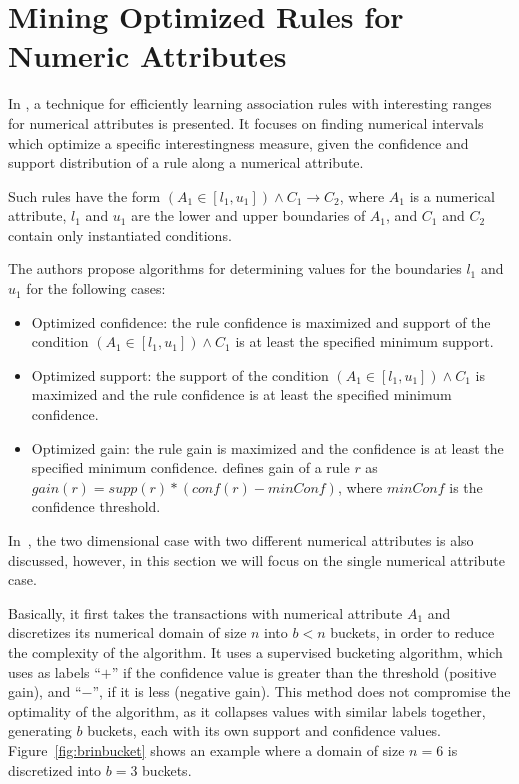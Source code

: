 \section{Mining Optimized Rules for Numeric Attributes}
\label{sec:rw-miningOptimizedRules}

In \cite{Brin99miningoptimized}, a technique for efficiently learning association rules with interesting ranges for
numerical attributes is presented. It focuses on finding numerical intervals which optimize a specific interestingness
measure, given the confidence and support distribution of a rule along a numerical attribute. 

Such rules have the form $(A_1 \in [l_1,u_1]) \wedge C_1 \rightarrow C_2$, where
$A_1$ is a numerical attribute, $l_1$ and $u_1$ are the lower and upper boundaries of $A_1$, and $C_1$ and $C_2$
contain
only instantiated conditions.

The authors propose algorithms for determining values for the boundaries $l_1$ and $u_1$ for the following cases:

\begin{itemize}
 \item Optimized confidence: the rule confidence is maximized and  support of the condition $(A_1 \in [l_1,u_1])
\wedge
C_1$ is at least the specified minimum support.
  \item Optimized support: the support of the condition $(A_1 \in [l_1,u_1]) \wedge C_1$ is maximized and the rule
confidence is at least the specified minimum confidence.
  \item Optimized gain: the rule gain is maximized and the confidence is at least the specified minimum confidence.
\cite{Brin99miningoptimized} defines gain of a rule $r$ as $gain(r)= supp(r)*(conf(r)-minConf)$, where $minConf$ is the
confidence threshold.
\end{itemize}

In~\cite{Brin99miningoptimized}, the two dimensional case with two different numerical attributes is also discussed,
however, in this section we will focus on the single numerical attribute case.

Basically, it first takes the transactions with numerical attribute $A_1$ and discretizes its numerical domain of size
$n$ into $b < n$ buckets, in order to reduce the complexity of the algorithm. It uses a supervised bucketing algorithm,
which uses as labels ``$+$'' if the confidence value is greater than the threshold (positive gain), and ``$-$'', if it
is less (negative gain). This method does not compromise the optimality of the algorithm, as it collapses values with
similar labels together, generating $b$ buckets, each with its own support and confidence values.
Figure~\ref{fig:brinbucket} shows an example where a domain of size $n=6$ is discretized into $b=3$ buckets.

